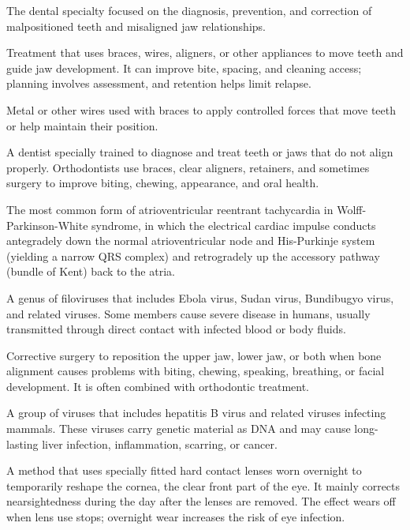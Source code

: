  The dental specialty focused on the diagnosis, prevention, and correction of malpositioned teeth and misaligned jaw relationships.

 Treatment that uses braces, wires, aligners, or other appliances to move teeth and guide jaw development. It can improve bite, spacing, and cleaning access; planning involves assessment, and retention helps limit relapse.

 Metal or other wires used with braces to apply controlled forces that move teeth or help maintain their position.

 A dentist specially trained to diagnose and treat teeth or jaws that do not align properly. Orthodontists use braces, clear aligners, retainers, and sometimes surgery to improve biting, chewing, appearance, and oral health.

 The most common form of atrioventricular reentrant tachycardia in Wolff-Parkinson-White syndrome, in which the electrical cardiac impulse conducts antegradely down the normal atrioventricular node and His-Purkinje system (yielding a narrow QRS complex) and retrogradely up the accessory pathway (bundle of Kent) back to the atria.

 A genus of filoviruses that includes Ebola virus, Sudan virus, Bundibugyo virus, and related viruses. Some members cause severe disease in humans, usually transmitted through direct contact with infected blood or body fluids.

 Corrective surgery to reposition the upper jaw, lower jaw, or both when bone alignment causes problems with biting, chewing, speaking, breathing, or facial development. It is often combined with orthodontic treatment.

 A group of viruses that includes hepatitis B virus and related viruses infecting mammals. These viruses carry genetic material as DNA and may cause long-lasting liver infection, inflammation, scarring, or cancer.

 A method that uses specially fitted hard contact
lenses worn overnight to temporarily reshape the cornea, the clear front part
of the eye. It mainly corrects nearsightedness during the day after the lenses
are removed. The effect wears off when lens use stops; overnight wear increases
the risk of eye infection.

